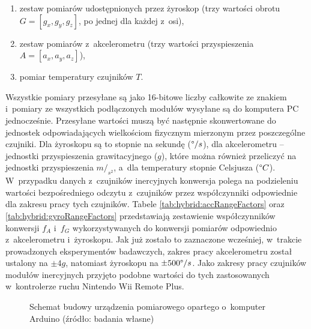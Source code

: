 \begin{enumerate}
	\item zestaw pomiarów udostępnionych przez żyroskop (trzy wartości obrotu $G = [g_x, g_y, g_z]$, po jednej dla każdej z~osi),
	\item zestaw pomiarów z~akcelerometru (trzy wartości przyspieszenia $A = [a_x, a_y, a_z]$),
	\item pomiar temperatury czujników $T$.
\end{enumerate}

Wszystkie pomiary przesyłane są jako 16-bitowe liczby całkowite ze znakiem i~pomiary ze wszystkich podłączonych modułów wysyłane są do komputera PC jednocześnie. Przesyłane wartości muszą być następnie skonwertowane do jednostek odpowiadających wielkościom fizycznym mierzonym przez poszczególne czujniki. Dla żyroskopu są to stopnie na sekundę ($\degree/s$), dla akcelerometru -- jednostki przyspieszenia grawitacyjnego ($g$), które można również przeliczyć na jednostki przyspieszenia $m/_{s^2}$, a~dla temperatury stopnie Celsjusza ($\degree C$). W~przypadku danych z~czujników inercyjnych konwersja polega na podzieleniu wartości bezpośredniego odczytu z~czujników przez współczynniki odpowiednie dla zakresu pracy tych czujników. Tabele \ref{tab:hybrid:accRangeFactors} oraz \ref{tab:hybrid:gyroRangeFactors} przedstawiają zestawienie współczynników konwersji $f_A$ i~$f_G$ wykorzystywanych do konwersji pomiarów odpowiednio z~akcelerometru i~żyroskopu. Jak już zostało to zaznaczone wcześniej, w~trakcie prowadzonych eksperymentów badawczych, zakres pracy akcelerometru został ustalony na $\pm4g$, natomiast żyroskopu na $\pm500\degree/s$. Jako zakresy pracy czujników modułów inercyjnych przyjęto podobne wartości do tych zastosowanych w~kontrolerze ruchu Nintendo Wii Remote Plus. 
	
\begin{figure}[!htb]
	\centering
	\caption{Schemat budowy urządzenia pomiarowego opartego o~komputer Arduino (źródło: badania własne)}	
	\label{fig:device:circuitDiagram}
\end{figure}
		
